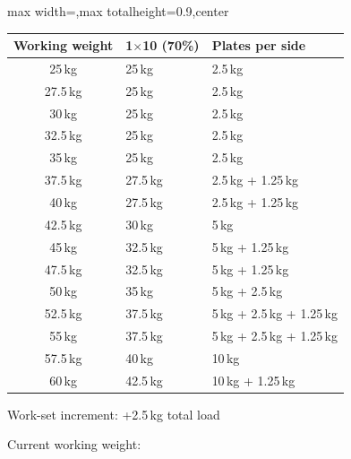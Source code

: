 \documentclass[11pt,a4paper]{article}
\newcommand{\tablearraystretch}{1.15}
\begin{document}
\begin{center}
\renewcommand{\arraystretch}{\tablearraystretch}
\begin{adjustbox}{max width=\linewidth,max totalheight=0.9\textheight,center}
\begin{tabular}{cll}
\toprule
Working weight & 1$\times$10 (70\%) & Plates per side \\
\midrule
25\,kg   & 25\,kg   & 2.5\,kg \\
27.5\,kg & 25\,kg   & 2.5\,kg \\
30\,kg   & 25\,kg   & 2.5\,kg \\
32.5\,kg & 25\,kg   & 2.5\,kg \\
35\,kg   & 25\,kg   & 2.5\,kg \\
37.5\,kg & 27.5\,kg & 2.5\,kg + 1.25\,kg \\
40\,kg   & 27.5\,kg & 2.5\,kg + 1.25\,kg \\
42.5\,kg & 30\,kg   & 5\,kg \\
45\,kg   & 32.5\,kg & 5\,kg + 1.25\,kg \\
47.5\,kg & 32.5\,kg & 5\,kg + 1.25\,kg \\
50\,kg   & 35\,kg   & 5\,kg + 2.5\,kg \\
52.5\,kg & 37.5\,kg & 5\,kg + 2.5\,kg + 1.25\,kg \\
55\,kg   & 37.5\,kg & 5\,kg + 2.5\,kg + 1.25\,kg \\
57.5\,kg & 40\,kg   & 10\,kg \\
60\,kg   & 42.5\,kg & 10\,kg + 1.25\,kg \\
\bottomrule
\end{tabular}
\end{adjustbox}
\renewcommand{\arraystretch}{1}
\end{center}

Work-set increment: +2.5\,kg total load

Current working weight:
\end{document}
